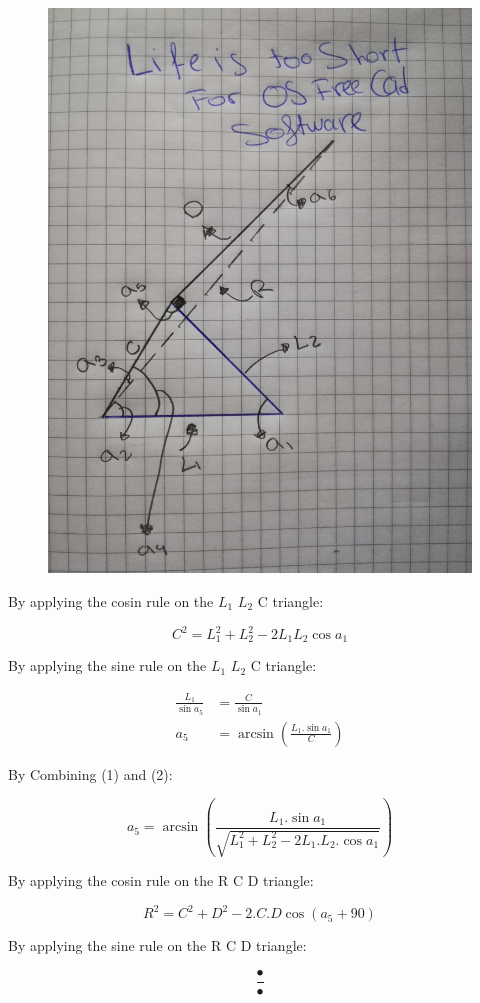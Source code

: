 \documentclass[11pt,twoside,a4paper]{article}
\begin{document}
	\begin{figure}
		\includegraphics[scale=0.2,natwidth=2448,natheight=3264]{../docs/equation.jpg}
	\end{figure}

	By applying the cosin rule on the $L_1$ $L_2$ C triangle:

	\begin{equation}
		C^2 = L_1^2 + L_2^2 -2 L_1 L_2 \cos a_1
	\end{equation}

	By applying the sine rule on the $L_1$ $L_2$ C triangle:
	
	\begin{align*}
		\frac{L_1}{\sin a_5} &= \frac{C}{\sin a_1}\\
		a_5 &= \arcsin \left(\frac{L_1 . \sin a_1}{C}\right)
	\end{align*}
	
	By Combining (1) and (2):
	
	\begin{equation}
		a_5 = \arcsin \left(\frac{L_1 . \sin a_1}{\sqrt{L_1^2 + L_2^2 - 2 L_1.L_2.\cos a_1}}\right)
	\end{equation}
	
	By applying the cosin rule on the R C D triangle:
	
	\begin{equation}
		R^2 = C^2 + D^2 - 2.C.D\cos(a_5+90)
	\end{equation}
	
	By applying the sine rule on the R C D triangle:
	
	\begin{equation}
		\frac{•}{•}
	\end{equation}
\end{document}
